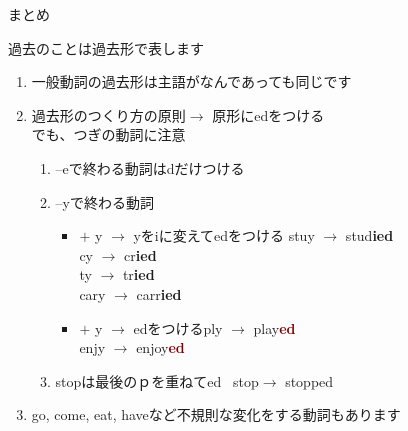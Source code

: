 \documentclass[aspectratio=169,xcolor={dvipsnames,table}]{beamer}
\begin{document}
\begin{frame}[plain]{まとめ}
 \begin{alertblock}{過去のことは過去形で表します}\small
\begin{enumerate}
 \item 一般動詞の過去形は主語がなんであっても同じです
 \item 過去形のつくり方の原則$\longrightarrow$ 原形にedをつける\\
でも、つぎの動詞に注意
       \begin{enumerate}
	\item --eで終わる動詞はdだけつける
	\item --yで終わる動詞\begin{itemize}
	         \item {} $+$ y $\longrightarrow$ yをiに変えてedをつける%
\hfill{}stuy $\rightarrow$ stud\textcolor{NavyBlue}{\bfseries ied}\\
\hfill{}cy $\rightarrow$ cr\textcolor{NavyBlue}{\bfseries ied}\\
\hfill{}ty $\rightarrow$ tr\textcolor{NavyBlue}{\bfseries ied}\\
\hfill{}cary $\rightarrow$ carr\textcolor{NavyBlue}{\bfseries ied}
  \item {} $+$ y $\longrightarrow$ edをつける\hfill{}ply $\rightarrow$ play\textcolor{Maroon}{\bfseries ed}\\
\hfill{}enjy $\rightarrow$ enjoy\textcolor{Maroon}{\bfseries ed}
	      \end{itemize}
	\item stopは最後のｐを重ねてed\,\,\,\,\,stop$\longrightarrow$ stopped
       \end{enumerate}
 \item go, come, eat, haveなど不規則な変化をする動詞もあります
\end{enumerate}


\end{alertblock}

\end{frame}
\end{document}
